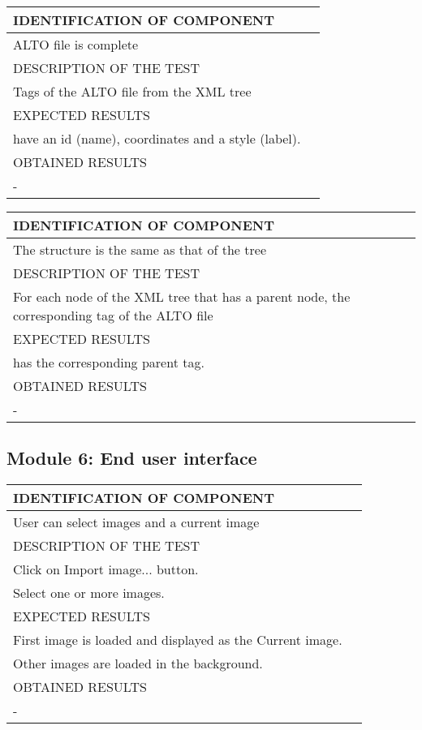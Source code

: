 \documentclass{polytech/polytech}
\numberwithin{figure}{chapter}
\begin{document}
\begin{appendix}
\begin{table}[]
\begin{tabular}{|l|l|}\hline
\color{C} IDENTIFICATION OF COMPONENT \\\hline
ALTO file is complete  \\\hline
\color{C} DESCRIPTION OF THE TEST\\\hline
Tags of the ALTO file from the XML tree      \\\hline
\color{C} EXPECTED RESULTS \\\hline
have an id (name), coordinates and a style (label). \\\hline
\color{C} OBTAINED RESULTS \\\hline
- \\\hline
\end{tabular}
\end{table}

\begin{table}[]
\begin{tabular}{|l|l|}\hline
\color{C} IDENTIFICATION OF COMPONENT \\\hline
The structure is the same as that of the tree \\\hline
\color{C} DESCRIPTION OF THE TEST\\\hline
For each node of the XML tree that has a parent node, the corresponding tag of the ALTO file      \\\hline
\color{C} EXPECTED RESULTS \\\hline
has the corresponding parent tag. \\\hline
\color{C} OBTAINED RESULTS \\\hline
- \\\hline
\end{tabular}
\end{table}

\subsection{Module 6: End user interface}

\begin{table}[]
\begin{tabular}{|l|l|}\hline
\color{C} IDENTIFICATION OF COMPONENT \\\hline
User can select images and a current image  \\\hline
\color{C} DESCRIPTION OF THE TEST\\\hline
Click on Import image... button.\\ Select one or more images. \\\hline
\color{C} EXPECTED RESULTS \\\hline
First image is loaded and displayed as the Current image.\\ Other images are loaded in the background. \\\hline
\color{C} OBTAINED RESULTS \\\hline
- \\\hline
\end{tabular}
\end{table}


\end{appendix}
\end{document}

